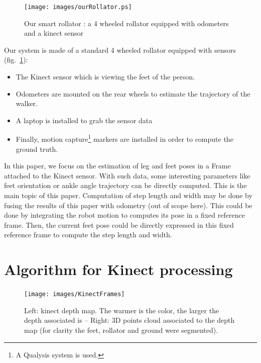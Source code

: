 \documentclass[letterpaper, 10 pt, conference]{ieeeconf}
\newcommand{\CDOK}[2]{{#1}} %
\begin{document}
\begin{figure}[h]
	\centering
	\texttt{[image: images/ourRollator.ps]}
	\caption{Our smart rollator : a 4 wheeled rollator equipped with odometers and a kinect sensor}
	\label{fig:ourrollator}
\end{figure}


Our system is made \CDOK{of}{by} a standard \CDOK{4 wheeled rollator}{walker} \CDOK{equipped with sensors}{on which some equipment was installed} (fig.~\ref{fig:ourrollator}):
\begin{itemize}
	\item The Kinect sensor which is viewing the feet of the person.
	\item Odometers \CDOK{are}{were} mounted on the rear wheels to estimate the trajectory of the walker.
	\item A laptop \CDOK{is}{was} installed to grab the sensor data
	\item Finally, motion capture\footnote{A Qualysis system is used.} markers \CDOK{are}{were} installed in order to compute the ground truth. 
\end{itemize}


In this paper, we focus on the estimation of leg and feet poses in a Frame attached to the Kinect sensor. With such data, some interesting parameters like feet orientation or ankle angle trajectory can be directly computed. This is the main topic of this paper. Computation of step length and width may be done by fusing the results of this paper with odometry (out of scope here). \CDOK{This could be done by integrating the robot motion to computes its pose in a fixed reference frame. Then, the current feet pose could be directly expressed in this fixed reference frame to compute the step length and width.}{}



\section{Algorithm for Kinect processing}
\label{sec:Algorithm}

\begin{figure}
	\centering
	\texttt{[image: images/KinectFrames]}
	\caption{Left: kinect depth map. The warmer is the color, the larger the depth associated is -- Right: 3D points cloud associated to the depth map (for clarity the feet, rollator and ground were segmented).}
	\label{fig:KinectFrames}
\end{figure}
\end{document}
